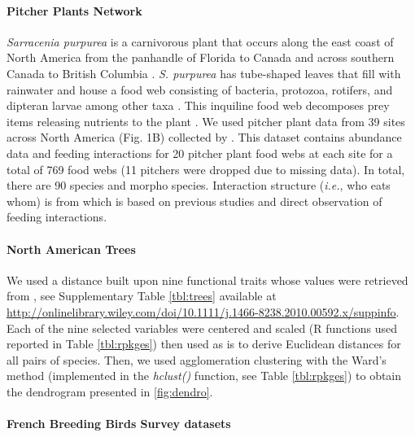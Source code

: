 \paragraph{Pitcher Plants Network}\label{pitcher-plants-network}

\emph{Sarracenia purpurea} is a carnivorous plant that occurs along the
east coast of North America from the panhandle of Florida to Canada and
across southern Canada to British Columbia \citep{Buckley2010}. \emph{S.
purpurea} has tube-shaped leaves that fill with rainwater and house a
food web consisting of bacteria, protozoa, rotifers, and dipteran larvae
among other taxa \citep{Addicott1974, Buckley2010}. This inquiline food
web decomposes prey items releasing nutrients to the plant
\citep{Mouquet2008, Baiser2011}. We used pitcher plant data from 39
sites across North America (Fig. 1B) collected by \citet{Buckley2010}.
This dataset contains abundance data and feeding interactions for 20
pitcher plant food webs at each site for a total of 769 food webs (11
pitchers were dropped due to missing data). In total, there are 90
species and morpho species. Interaction structure (\emph{i.e.}, who eats
whom) is from \citet{Baiser2012} which is based on previous studies
\citep[\emph{e.g.},][\citet{Butler2008}]{Addicott1974, Miller2002} and
direct observation of feeding interactions.

\paragraph{North American Trees}\label{north-american-trees}

We used a distance built upon nine functional traits whose values were
retrieved from \citep{Paquette2011}, see Supplementary Table
\ref{tbl:trees} available at
\url{http://onlinelibrary.wiley.com/doi/10.1111/j.1466-8238.2010.00592.x/suppinfo}.
Each of the nine selected variables were centered and scaled (R
functions used reported in Table \ref{tbl:rpkges}) then used as is to
derive Euclidean distances for all pairs of species. Then, we used
agglomeration clustering with the Ward's method (implemented in the
\emph{hclust()} function, see Table \ref{tbl:rpkges}) to obtain the
dendrogram presented in \ref{fig:dendro}.

\paragraph{French Breeding Birds Survey
datasets}\label{french-breeding-birds-survey-datasets}

